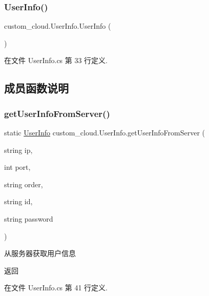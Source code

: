 \subsubsection{\texorpdfstring{User\+Info()}{UserInfo()}}
{\footnotesize\ttfamily custom\+\_\+cloud.\+User\+Info.\+User\+Info (\begin{DoxyParamCaption}{ }\end{DoxyParamCaption})}



在文件 User\+Info.\+cs 第 33 行定义.



\subsection{成员函数说明}
\mbox{\label{classcustom__cloud_1_1_user_info_a1da7fb72baa3ae45811d3ae3ba218f65}} 
\subsubsection{\texorpdfstring{get\+User\+Info\+From\+Server()}{getUserInfoFromServer()}}
{\footnotesize\ttfamily static \hyperlink{classcustom__cloud_1_1_user_info}{User\+Info} custom\+\_\+cloud.\+User\+Info.\+get\+User\+Info\+From\+Server (\begin{DoxyParamCaption}\item[{string}]{ip,  }\item[{int}]{port,  }\item[{string}]{order,  }\item[{string}]{id,  }\item[{string}]{password }\end{DoxyParamCaption})\hspace{0.3cm}{\ttfamily [static]}}



从服务器获取用户信息 

\begin{DoxyReturn}{返回}

\end{DoxyReturn}


在文件 User\+Info.\+cs 第 41 行定义.

